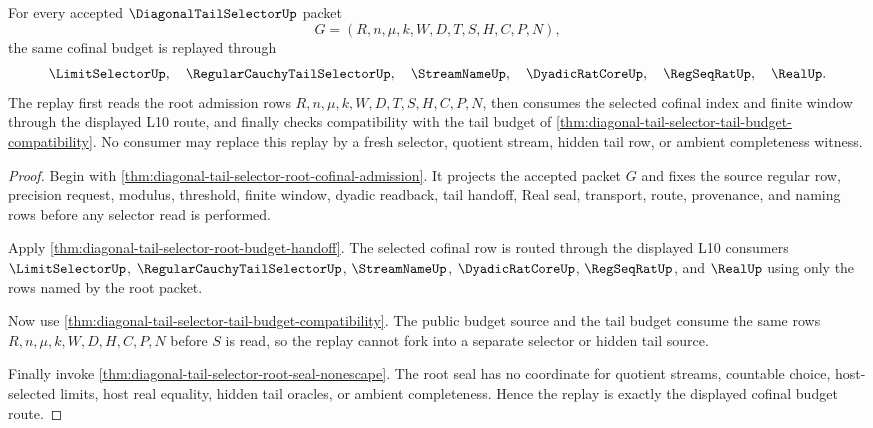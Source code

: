 \begin{theorem}
\label{thm:diagonal-tail-selector-cofinal-budget-replay}
For every accepted $\DiagonalTailSelectorUp$ packet
$$
G=(R,n,\mu,k,W,D,T,S,H,C,P,N),
$$
the same cofinal budget is replayed through
$$
\LimitSelectorUp,\quad
\RegularCauchyTailSelectorUp,\quad
\StreamNameUp,\quad
\DyadicRatCoreUp,\quad
\RegSeqRatUp,\quad
\RealUp.
$$
The replay first reads the root admission rows $R,n,\mu,k,W,D,T,S,H,C,P,N$,
then consumes the selected cofinal index and finite window through the
displayed L10 route, and finally checks compatibility with the tail budget of
\autoref{thm:diagonal-tail-selector-tail-budget-compatibility}. No consumer
may replace this replay by a fresh selector, quotient stream, hidden tail row,
or ambient completeness witness.
\end{theorem}
\begin{proof}
Begin with \autoref{thm:diagonal-tail-selector-root-cofinal-admission}. It
projects the accepted packet $G$ and fixes the source regular row, precision
request, modulus, threshold, finite window, dyadic readback, tail handoff,
Real seal, transport, route, provenance, and naming rows before any selector
read is performed.

Apply \autoref{thm:diagonal-tail-selector-root-budget-handoff}. The selected
cofinal row is routed through the displayed L10 consumers
$\LimitSelectorUp$, $\RegularCauchyTailSelectorUp$, $\StreamNameUp$,
$\DyadicRatCoreUp$, $\RegSeqRatUp$, and $\RealUp$ using only the rows named
by the root packet.

Now use
\autoref{thm:diagonal-tail-selector-tail-budget-compatibility}. The public
budget source and the tail budget consume the same rows
$R,n,\mu,k,W,D,H,C,P,N$ before $S$ is read, so the replay cannot fork into a
separate selector or hidden tail source.

Finally invoke \autoref{thm:diagonal-tail-selector-root-seal-nonescape}. The
root seal has no coordinate for quotient streams, countable choice,
host-selected limits, host real equality, hidden tail oracles, or ambient
completeness. Hence the replay is exactly the displayed cofinal budget route.
\end{proof}

